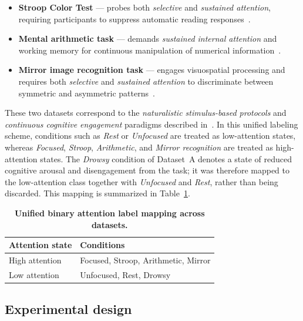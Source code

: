 \documentclass[10pt,letterpaper]{article}
\newcommand{\rev}[1]{\par\noindent\colorbox{yellow}{\parbox{\dimexpr\linewidth-2\fboxsep\relax}{#1}}\par}
\renewcommand{\rev}[1]{#1}
\begin{document}
\begin{itemize}
  \item \textbf{Stroop Color Test} --- probes both \textit{selective} and \textit{sustained attention}, requiring participants to suppress automatic reading responses~\cite{macleod1991stroop,scarpina2017stroop,esterman2013neural}.
  \item \textbf{Mental arithmetic task} --- demands \textit{sustained internal attention} and working memory for continuous manipulation of numerical information~\cite{grabner2007math,zhou2010eeg}.
  \item \textbf{Mirror image recognition task} --- engages visuospatial processing and requires both \textit{selective} and \textit{sustained attention} to discriminate between symmetric and asymmetric patterns~\cite{shepard1971mental,hyun2007visual,voyer2011performance}.
\end{itemize}

These two datasets correspond to the \textit{naturalistic stimulus-based protocols} and \textit{continuous cognitive engagement} paradigms described in~\cite{chen2025hybrid}. In this unified labeling scheme, conditions such as \textit{Rest} or \textit{Unfocused} are treated as low-attention states, whereas \textit{Focused}, \textit{Stroop}, \textit{Arithmetic}, and \textit{Mirror recognition} are treated as high-attention states. \rev{The \textit{Drowsy} condition of Dataset~A denotes a state of reduced cognitive arousal and disengagement from the task; it was therefore mapped to the low-attention class together with \textit{Unfocused} and \textit{Rest}, rather than being discarded.} This mapping is summarized in Table~\ref{tab:label_mapping}.

\begin{table}[!ht]
\centering
\caption{\textbf{Unified binary attention label mapping across datasets.}}
\label{tab:label_mapping}
\begin{tabular}{|l|l|}
\hline
\textbf{Attention state} & \textbf{Conditions} \\ \hline
High attention & Focused, Stroop, Arithmetic, Mirror \\ \hline
Low attention  & Unfocused, Rest, \cellcolor{yellow}Drowsy \\ \hline
\end{tabular}
\end{table}

\subsection*{Experimental design}
\end{document}
